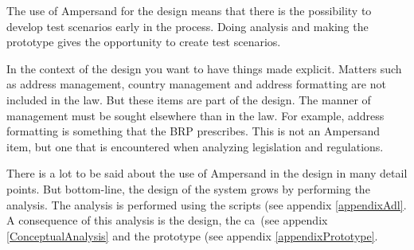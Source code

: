 The use of Ampersand for the design means that there is the possibility to develop test scenarios early in the process.
Doing analysis and making the prototype gives the opportunity to create test scenarios.

In the context of the design you want to have things made explicit.
Matters such as address management, country management and address formatting are not included in the law.
But these items are part of the design.
The manner of management must be sought elsewhere than in the law.
For example, address formatting is something that the BRP prescribes.
This is not an Ampersand item, but one that is encountered when analyzing legislation and regulations.

There is a lot to be said about the use of Ampersand in the design in many detail points.
But bottom-line, the design of the system grows by performing the analysis.
The analysis is performed using the scripts (see appendix \ref{appendixAdl}.
A consequence of this analysis is the design, the \acrshort{ca}~(see appendix \ref{ConceptualAnalysis} and the prototype (see appendix \ref{appendixPrototype}.